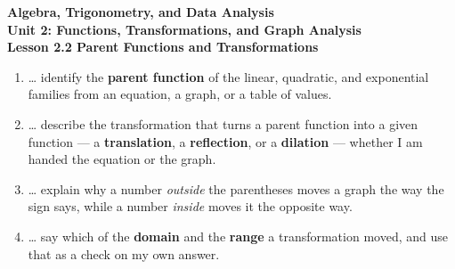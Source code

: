 \documentclass[10pt]{article}
\begin{document}
\vspace{-0.8in}

\begin{center}
  {\color{white}\textbf{\LARGE Algebra, Trigonometry, and Data Analysis}}\\[4pt]
  {\color{mistmid}\large\textbf{Unit 2: Functions, Transformations, and Graph Analysis}}\\[6pt]
  {\color{white}\textbf{\large Lesson 2.2 \quad Parent Functions and Transformations}}
\end{center}

\vspace{0.22in}
\namedateperiod
\vspace{0.18in}

\begin{learningtargetbox}
\small
\begin{enumerate}[leftmargin=1.5em, itemsep=5pt]
  \item \ldots{} identify the \textbf{parent function} of the linear, quadratic, and exponential
        families from an equation, a graph, or a table of values.
  \item \ldots{} describe the transformation that turns a parent function into a given function
        --- a \textbf{translation}, a \textbf{reflection}, or a \textbf{dilation} --- whether I am
        handed the equation or the graph.
  \item \ldots{} explain why a number \emph{outside} the parentheses moves a graph the way the sign
        says, while a number \emph{inside} moves it the opposite way.
  \item \ldots{} say which of the \textbf{domain} and the \textbf{range} a transformation moved,
        and use that as a check on my own answer.
\end{enumerate}
\end{learningtargetbox}

\vspace{0.14in}
\end{document}

